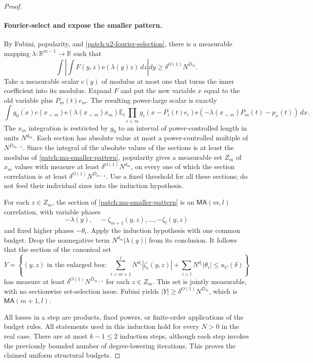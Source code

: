 \documentclass[11pt]{article}
\theoremstyle{definition}
\newcommand{\ee}[1]{\mathrm e\!\left(#1\right)}
\begin{document}
\begin{proof}
\paragraph{Fourier-select and expose the smaller pattern.}
By Fubini, popularity, and \cref{patch:u2-fourier-selection}, there is a measurable mapping
$\lambda:\mathbb R^{m-1}\to\mathbb R$ such that
\[
 \int\left|\int F(y,z)\ee{\lambda(y)z}\,dz\right|dy
                      \geq\delta^{O(1)}N^{D_m}.
\]
Take a measurable scalar $c(y)$ of modulus at most one that turns the inner coefficient
into its modulus.  Expand $F$ and put the new variable $x$ equal to the old variable plus
$P_m(t)e_m$.  The resulting power-large scalar is exactly
\[
 \label{patch:ma-smaller-pattern}
 \int \overline{g_0(x)}c(x_{<m})\ee{\lambda(x_{<m})x_m}
 \mathbb E_t\prod_{i<m}\overline{g_i(x-P_i(t)e_i)}
 \ee{-\lambda(x_{<m})P_m(t)-p_x(t)}\,dx.
 \tag{\theequation}
\]
The $x_m$ integration is restricted by $g_0$ to an interval of power-controlled length
in units $N^{d_m}$.  Each section has absolute value at most a power-controlled multiple
of $N^{D_{m-1}}$.  Since the integral of the absolute values of the sections is at least
the modulus of \eqref{patch:ma-smaller-pattern}, popularity gives a measurable set $Z_m$
of $x_m$ values with measure at least $\delta^{O(1)}N^{d_m}$, on every one of which the
section correlation is at least $\delta^{O(1)}N^{D_{m-1}}$.
Use a fixed threshold for all these sections; do not feed their individual sizes into the
induction hypothesis.

For each $z\in Z_m$, the section of \eqref{patch:ma-smaller-pattern} is an
$\mathsf{MA}(m,l)$ correlation, with variable phases
\[
 -\lambda(y),\quad -\zeta_{m+1}(y,z),\ldots,-\zeta_l(y,z)
\]
and fixed higher phases $-\theta_i$.
Apply the induction hypothesis with one common budget.  Drop the nonnegative term
$N^{d_m}|\lambda(y)|$ from its conclusion.  It follows that the section of the canonical set
\[
 Y=\left\{(y,z)\text{ in the enlarged box}:\
       \sum_{i=m+1}^lN^{d_i}|\zeta_i(y,z)|+
       \sum_{i>l}N^{d_i}|\theta_i|\leq u_C(\delta)\right\}
\]
has measure at least $\delta^{O(1)}N^{D_{m-1}}$ for each $z\in Z_m$.
This set is jointly measurable, with no sectionwise set-selection issue.
Fubini yields $|Y|\geq\delta^{O(1)}N^{D_m}$, which is $\mathsf{MA}(m+1,l)$.

All losses in a step are products, fixed powers, or finite-order applications of the budget
rules.  All statements used in this induction hold for every $N>0$ in the real case.
There are at most $k-1\leq2$ induction steps, although each step invokes the
previously bounded number of degree-lowering iterations.  This proves the claimed uniform
structural budgets.
\end{proof}
\end{document}
